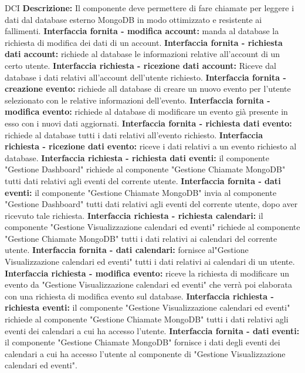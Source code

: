 \begin{listaPersonale}{DCI}
    \textbf{Descrizione:} Il componente deve permettere di fare chiamate per leggere i dati dal database esterno MongoDB in modo ottimizzato e resistente ai fallimenti.
    \textbf{Interfaccia fornita - modifica account:} manda al database la richiesta di modifica dei dati di un account.
    \textbf{Interfaccia fornita - richiesta dati account:} richiede al database le informazioni relative all'account di un certo utente.
    \textbf{Interfaccia richiesta - ricezione dati account:} Riceve dal database i dati relativi all'account dell'utente richiesto.
    \textbf{Interfaccia fornita - creazione evento:} richiede all database di creare un nuovo evento per l'utente selezionato con le relative informazioni dell'evento.
    \textbf{Interfaccia fornita - modifica evento:} richiede al database di modificare un evento già presente in esso con i nuovi dati aggiornati.
    \textbf{Interfaccia fornita - richiesta dati evento:} richiede al database tutti i dati relativi all'evento richiesto.
    \textbf{Interfaccia richiesta - ricezione dati evento:} riceve i dati relativi a un evento richiesto al database.
    \textbf{Interfaccia richiesta - richiesta dati eventi:} il componente "Gestione Dashboard" richiede al componente "Gestione Chiamate MongoDB" tutti dati relativi agli eventi del corrente utente.
    \textbf{Interfaccia fornita - dati eventi:} il componente "Gestione Chiamate MongoDB" invia al componente "Gestione Dashboard" tutti dati relativi agli eventi del corrente utente, dopo aver ricevuto tale richiesta.
    \textbf{Interfaccia richiesta - richiesta calendari:} il componente "Gestione Visualizzazione calendari ed eventi" richiede al componente "Gestione Chiamate MongoDB" tutti i dati relativi ai calendari del corrente utente.
    \textbf{Interfaccia fornita - dati calendari:} fornisce al"Gestione Visualizzazione calendari ed eventi" tutti i dati relativi ai calendari di un utente.
    \textbf{Interfaccia richiesta - modifica evento:} riceve la richiesta di modificare un evento da  "Gestione Visualizzazione calendari ed eventi" che verrà poi elaborata con una richiesta di modifica evento sul database.
    \textbf{Interfaccia richiesta - richiesta eventi:} il componente "Gestione Visualizzazione calendari ed eventi" richiede al componente "Gestione Chiamate MongoDB" tutti i dati relativi agli eventi dei calendari a cui ha accesso l'utente.
    \textbf{Interfaccia fornita - dati eventi:} il componente "Gestione Chiamate MongoDB" fornisce i dati degli eventi dei calendari a cui ha accesso l'utente al componente di "Gestione Visualizzazione calendari ed eventi".

\end{listaPersonale}

